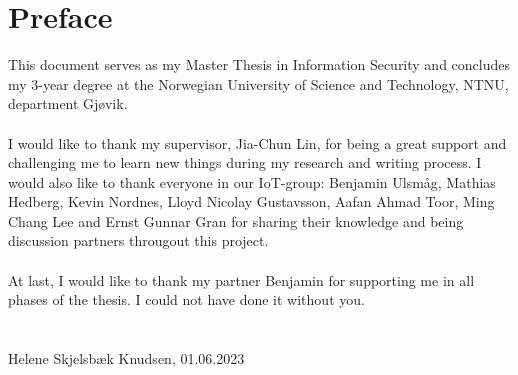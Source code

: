 \chapter*{Preface}
This document serves as my Master Thesis in Information Security and concludes my 3-year degree at the Norwegian University of Science and Technology, NTNU, department Gjøvik.
\\\\
I would like to thank my supervisor, Jia-Chun Lin, for being a great support and challenging me to learn new things during my research and writing process. I would also like to thank everyone in our \gls{IoT}-group: Benjamin Ulsmåg, Mathias Hedberg, Kevin Nordnes, Lloyd Nicolay Gustavsson, Aafan Ahmad Toor, Ming Chang Lee and Ernst Gunnar Gran for sharing their knowledge and being discussion partners througout this project. 
\\\\
At last, I would like to thank my partner Benjamin for supporting me in all phases of the thesis. I could not have done it without you. 
\\\\\\
Helene Skjelsbæk Knudsen, 01.06.2023
